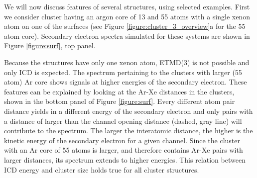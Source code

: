 We will now discuss features of several structures, using selected examples.
First we consider cluster having an argon core of 13 and 55 atoms with a single xenon
atom on one of the surfaces (see Figure \ref{figure:cluster_3_overview}a
for the 55 atom core).
Secondary electron spectra simulated for these systems are shown in Figure \ref{figure:surf}, top panel.


Because the structures have only one xenon atom, ETMD(3) is not possible
and only ICD is expected. 
The spectrum pertaining to the clusters with larger (55 atom) Ar core shows
signals at higher energies of the secondary electron. These features
can be explained by looking at the Ar-Xe distances in the clusters, shown
in the bottom panel of Figure \ref{figure:surf}. 
Every different atom pair distance
yields in a different energy of the secondary electron and only pairs
with a distance of larger than the channel opening distance
(dashed, gray line) will contribute
to the spectrum. 
The larger the interatomic distance, the higher is the
kinetic energy of the secondary electron for a given channel.
Since the cluster with an Ar core of 55 atoms is larger, and therefore
contains Ar-Xe pairs with larger distances, its spectrum extends to
higher energies.
This relation between ICD energy and cluster size holds true for all cluster structures.

